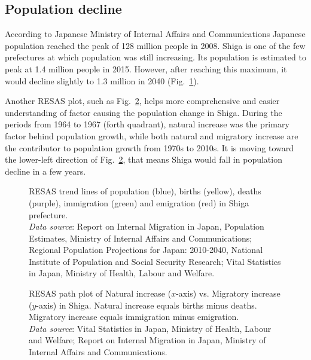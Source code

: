 \documentclass[10pt, conference, compsocconf]{IEEEtran}
\begin{document}
\subsection{Population decline}
According to Japanese Ministry of Internal Affairs and Communications Japanese population reached the peak of 128 million people in 2008.
Shiga is one of the few prefectures at which population was still increasing. Its population is estimated to peak at 1.4 million people in 2015. However, after reaching this maximum, it would decline slightly to 1.3 million in 2040 (Fig.~\ref{fig1}). 

Another RESAS plot, such as Fig.~\ref{fig2}, helps more comprehensive and easier understanding of factor causing the population change in Shiga. 
During the periods from 1964 to 1967 (forth quadrant), natural increase was the primary factor behind population growth, while both natural and migratory increase are the contributor to population growth from 1970s to 2010s. It is moving toward the lower-left direction of Fig.~\ref{fig2}, that means Shiga would fall in population decline in a few years. 

\begin{figure}[!t]
\begin{center}
\caption{RESAS trend lines of population (blue), births (yellow), deaths (purple), immigration (green) and emigration (red) in Shiga prefecture. 
\\{\it Data source}: Report on Internal Migration in Japan, Population Estimates, Ministry of Internal Affairs and Communications; Regional Population Projections for Japan: 2010-2040, National Institute of Population and Social Security Research; Vital Statistics in Japan, Ministry of Health, Labour and Welfare.
}\label{fig1}
\end{center}
\end{figure}
\begin{figure}[!t]
\begin{center}
\caption{RESAS path plot of Natural increase ($x$-axis) vs. Migratory increase ($y$-axis) in Shiga. Natural increase equals births minus deaths. Migratory increase equals immigration minus emigration.
\\{\it Data source}: Vital Statistics in Japan, Ministry of Health, Labour and Welfare; Report on Internal Migration in Japan, Ministry of Internal Affairs and Communications.
}\label{fig2}
\end{center}
\end{figure}
\end{document}
